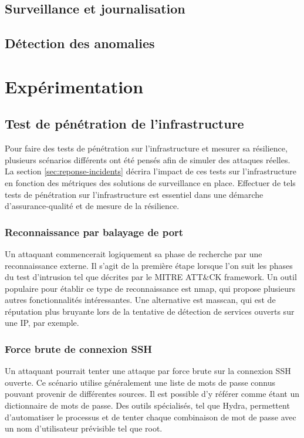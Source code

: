 \documentclass[conference]{IEEEtran}
\begin{document}
\subsection{Surveillance et journalisation}

\subsection{Détection des anomalies}

\section{Expérimentation}


\subsection{Test de pénétration de l'infrastructure}
Pour faire des tests de pénétration sur l'infrastructure et mesurer sa résilience, plusieurs scénarios différents ont été pensés afin de simuler des attaques réelles. La section \ref{sec:reponse-incidents} décrira l'impact de ces tests sur l'infrastructure en fonction des métriques des solutions de surveillance en place. Effectuer de tels tests de pénétration sur l'infrastructure est essentiel dans une démarche d'assurance-qualité et de mesure de la résilience.

\subsubsection{Reconnaissance par balayage de port}
Un attaquant commencerait logiquement sa phase de recherche par une reconnaissance externe. Il s'agit de la première étape lorsque l'on suit les phases du test d'intrusion tel que décrites par le MITRE ATT\&CK framework. Un outil populaire pour établir ce type de reconnaissance est nmap, qui propose plusieurs autres fonctionnalités intéressantes. Une alternative est masscan, qui est de réputation plus bruyante lors de la tentative de détection de services ouverts sur une IP, par exemple.

\subsubsection{Force brute de connexion SSH}
Un attaquant pourrait tenter une attaque par force brute sur la connexion SSH ouverte. Ce scénario utilise généralement une liste de mots de passe connus pouvant provenir de différentes sources. Il est possible d'y référer comme étant un dictionnaire de mots de passe. Des outils spécialisés, tel que Hydra, permettent d'automatiser le processus et de tenter chaque combinaison de mot de passe avec un nom d'utilisateur prévisible tel que root.
\end{document}
